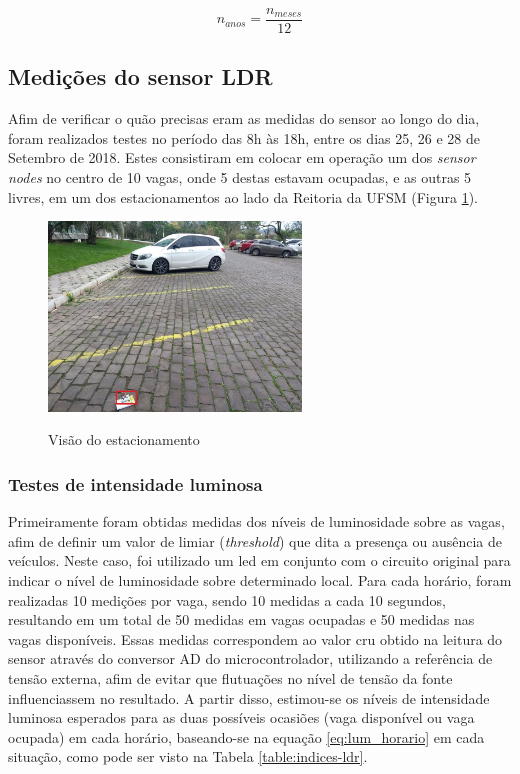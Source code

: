 \documentclass[oneside,openright,12pt]{ufsm_2015} %
\begin{document}
    \begin{equation}
        n_{anos} = \frac{n_{meses}}{12}
        \label{eq:n_anos}
    \end{equation}

    \subsection{Medições do sensor LDR}
    Afim de verificar o quão precisas eram as medidas do sensor ao longo do dia, foram realizados testes no período das 8h às 18h, entre os dias 25, 26 e 28 de Setembro de 2018. Estes consistiram em colocar em operação um dos \textit{sensor nodes} no centro de 10 vagas, onde 5 destas estavam ocupadas, e as outras 5 livres, em um dos estacionamentos ao lado da Reitoria da UFSM (Figura \ref{fig:estac-visao}).
    
    \begin{figure}[ht]
     	    \caption{\label{exepretex} Visão do estacionamento}
            \centering
            \includegraphics[width=0.6\textwidth]{figuras/estacionamento_visao.jpg}
            \vspace{\baselineskip} %
            \label{fig:estac-visao}
    \end{figure}
    
    \subsubsection{Testes de intensidade luminosa}
    Primeiramente foram obtidas medidas dos níveis de luminosidade sobre as vagas, afim de definir um valor de limiar (\textit{threshold}) que dita a presença ou ausência de veículos. Neste caso, foi utilizado um led em conjunto com o circuito original para indicar o nível de luminosidade sobre determinado local. Para cada horário, foram realizadas 10 medições por vaga, sendo 10 medidas a cada 10 segundos, resultando em um total de 50 medidas em vagas ocupadas e 50 medidas nas vagas disponíveis. Essas medidas correspondem ao valor cru obtido na leitura do sensor através do conversor AD do microcontrolador, utilizando a referência de tensão externa, afim de evitar que flutuações no nível de tensão da fonte influenciassem no resultado. A partir disso, estimou-se os níveis de intensidade luminosa esperados para as duas possíveis ocasiões (vaga disponível ou vaga ocupada) em cada horário, baseando-se na equação \ref{eq:lum_horario} em cada situação, como pode ser visto na Tabela \ref{table:indices-ldr}. 
\end{document}
